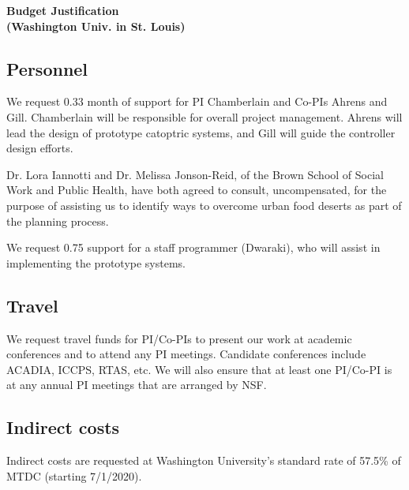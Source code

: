 \documentclass[11pt]{article}
\begin{document}
\pagestyle{empty}
\thispagestyle{empty}

\begin{center}
\textbf{\Large Budget Justification\\(Washington Univ. in St. Louis)}
\end{center}

\subsection*{Personnel}
We request 0.33 month of support for PI Chamberlain and Co-PIs
Ahrens and Gill.
Chamberlain will be responsible for overall project management. Ahrens will
lead the design of prototype catoptric systems, and Gill will guide the
controller design efforts.

\vspace{0.2in}
\noindent
Dr. Lora Iannotti and Dr. Melissa Jonson-Reid, of the Brown School
of Social Work and Public Health, have both agreed to consult,
uncompensated, for the purpose of assisting us to identify ways to overcome
urban food deserts as part of the planning process.

\vspace{0.2in}
\noindent
We request 0.75 support for a staff programmer (Dwaraki), who will assist
in implementing the prototype systems.

\subsection*{Travel}
We request travel funds for PI/Co-PIs
to present our work at academic 
conferences and to attend any PI meetings.
Candidate conferences include ACADIA, ICCPS, RTAS, etc.
We will also ensure that at least one PI/Co-PI is
at any annual PI meetings that are arranged by NSF. 

\subsection*{Indirect costs}
Indirect costs are requested at Washington University's standard rate of
57.5\% of MTDC (starting 7/1/2020).
\end{document}
